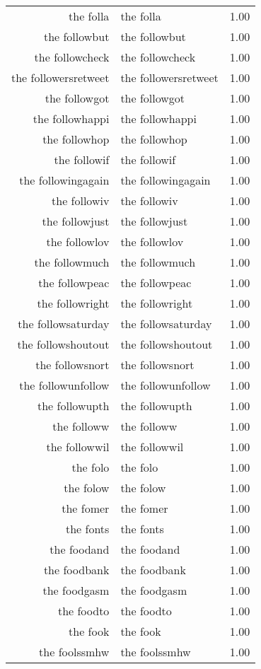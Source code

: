 \begin{table}[ht]
\begin{tabular}{rlr}
  the folla & the folla & 1.00 \\ 
  the followbut & the followbut & 1.00 \\ 
  the followcheck & the followcheck & 1.00 \\ 
  the followersretweet & the followersretweet & 1.00 \\ 
  the followgot & the followgot & 1.00 \\ 
  the followhappi & the followhappi & 1.00 \\ 
  the followhop & the followhop & 1.00 \\ 
  the followif & the followif & 1.00 \\ 
  the followingagain & the followingagain & 1.00 \\ 
  the followiv & the followiv & 1.00 \\ 
  the followjust & the followjust & 1.00 \\ 
  the followlov & the followlov & 1.00 \\ 
  the followmuch & the followmuch & 1.00 \\ 
  the followpeac & the followpeac & 1.00 \\ 
  the followright & the followright & 1.00 \\ 
  the followsaturday & the followsaturday & 1.00 \\ 
  the followshoutout & the followshoutout & 1.00 \\ 
  the followsnort & the followsnort & 1.00 \\ 
  the followunfollow & the followunfollow & 1.00 \\ 
  the followupth & the followupth & 1.00 \\ 
  the followw & the followw & 1.00 \\ 
  the followwil & the followwil & 1.00 \\ 
  the folo & the folo & 1.00 \\ 
  the folow & the folow & 1.00 \\ 
  the fomer & the fomer & 1.00 \\ 
  the fonts & the fonts & 1.00 \\ 
  the foodand & the foodand & 1.00 \\ 
  the foodbank & the foodbank & 1.00 \\ 
  the foodgasm & the foodgasm & 1.00 \\ 
  the foodto & the foodto & 1.00 \\ 
  the fook & the fook & 1.00 \\ 
  the foolssmhw & the foolssmhw & 1.00 \\ 

\end{tabular}
\end{table}
